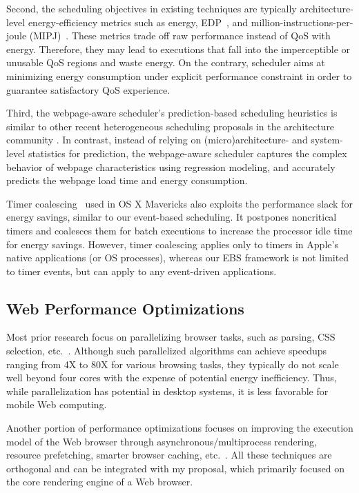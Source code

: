 Second, the scheduling objectives in existing techniques are typically architecture-level energy-efficiency metrics such as energy, EDP~\cite{edp}, and million-instructions-per-joule (MIPJ)~\cite{MIPJ}. These metrics trade off raw performance instead of QoS with energy. Therefore, they may lead to executions that fall into the imperceptible or unusable QoS regions and waste energy. On the contrary, \webrt scheduler  aims at minimizing energy consumption under explicit performance constraint in order to guarantee satisfactory QoS experience.

Third, the webpage-aware scheduler's prediction-based scheduling heuristics is similar to other recent heterogeneous scheduling proposals in the architecture community \cite{PIE,compositecores,tracephase,tm}. In contrast, instead of relying on (micro)architecture- and system-level statistics for prediction, the webpage-aware scheduler captures the complex behavior of webpage characteristics using regression modeling, and accurately predicts the webpage load time and energy consumption.

Timer coalescing~\cite{powerinosx} used in OS X Mavericks also exploits the performance slack for energy savings, similar to our event-based scheduling. It postpones noncritical timers and coalesces them for batch executions to increase the processor idle time for energy savings. However, timer coalescing applies only to timers in Apple's native applications (or OS processes), whereas our EBS framework is not limited to timer events, but can apply to any event-driven applications.

\subsection{Web Performance Optimizations}
\label{sec:runtime:related:perf}

Most prior research focus on parallelizing browser tasks, such as parsing, CSS selection, etc.~\cite{ParallelBrowser,FTL,UCI,Parabix}. Although such parallelized algorithms can achieve speedups ranging from 4X to 80X for various browsing tasks, they typically do not scale well beyond four cores with the expense of potential energy inefficiency. Thus, while parallelization has potential in desktop systems, it is less favorable for mobile Web computing.

Another portion of performance optimizations focuses on improving the execution model of the Web browser through asynchronous/multiprocess rendering, resource prefetching, smarter browser caching, etc.~\cite{pocketweb,Adrenaline,smart-caching,webkit2,firefox-spec_parsing}. All these techniques are orthogonal and can be integrated with my proposal, which primarily focused on the core rendering engine of a Web browser.

